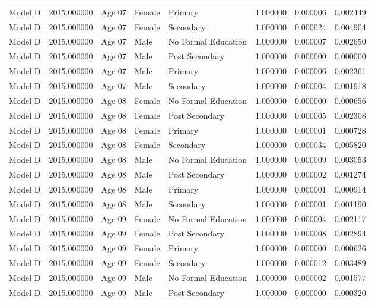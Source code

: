 \begin{table}[ht]
\begin{tabular}{lrlllrrr}
Model D & 2015.000000 & Age 07 & Female & Primary & 1.000000 & 0.000006 & 0.002449 \\
Model D & 2015.000000 & Age 07 & Female & Secondary & 1.000000 & 0.000024 & 0.004904 \\
Model D & 2015.000000 & Age 07 & Male & No Formal Education & 1.000000 & 0.000007 & 0.002650 \\
Model D & 2015.000000 & Age 07 & Male & Post Secondary & 1.000000 & 0.000000 & 0.000000 \\
Model D & 2015.000000 & Age 07 & Male & Primary & 1.000000 & 0.000006 & 0.002361 \\
Model D & 2015.000000 & Age 07 & Male & Secondary & 1.000000 & 0.000004 & 0.001918 \\
Model D & 2015.000000 & Age 08 & Female & No Formal Education & 1.000000 & 0.000000 & 0.000656 \\
Model D & 2015.000000 & Age 08 & Female & Post Secondary & 1.000000 & 0.000005 & 0.002308 \\
Model D & 2015.000000 & Age 08 & Female & Primary & 1.000000 & 0.000001 & 0.000728 \\
Model D & 2015.000000 & Age 08 & Female & Secondary & 1.000000 & 0.000034 & 0.005820 \\
Model D & 2015.000000 & Age 08 & Male & No Formal Education & 1.000000 & 0.000009 & 0.003053 \\
Model D & 2015.000000 & Age 08 & Male & Post Secondary & 1.000000 & 0.000002 & 0.001274 \\
Model D & 2015.000000 & Age 08 & Male & Primary & 1.000000 & 0.000001 & 0.000914 \\
Model D & 2015.000000 & Age 08 & Male & Secondary & 1.000000 & 0.000001 & 0.001190 \\
Model D & 2015.000000 & Age 09 & Female & No Formal Education & 1.000000 & 0.000004 & 0.002117 \\
Model D & 2015.000000 & Age 09 & Female & Post Secondary & 1.000000 & 0.000008 & 0.002894 \\
Model D & 2015.000000 & Age 09 & Female & Primary & 1.000000 & 0.000000 & 0.000626 \\
Model D & 2015.000000 & Age 09 & Female & Secondary & 1.000000 & 0.000012 & 0.003489 \\
Model D & 2015.000000 & Age 09 & Male & No Formal Education & 1.000000 & 0.000002 & 0.001577 \\
Model D & 2015.000000 & Age 09 & Male & Post Secondary & 1.000000 & 0.000000 & 0.000320 \\

\end{tabular}
\end{table}
